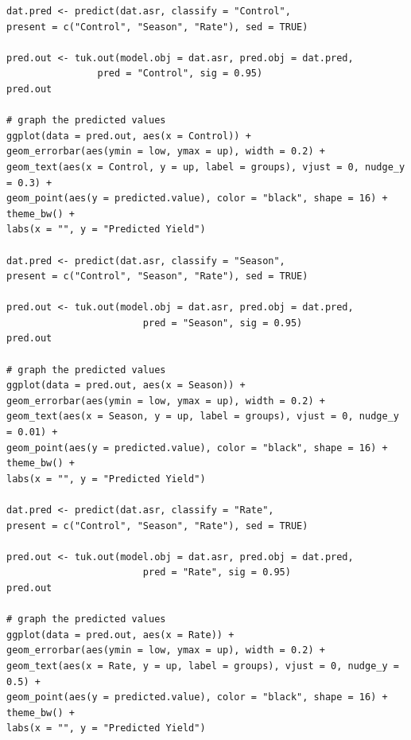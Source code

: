 \documentclass[a4paper, 10pt, fleqn, twosided]{memoir}
\begin{document}
\begin{tcolorbox}[title = Exercise 17 code]
\begin{verbatim}
dat.pred <- predict(dat.asr, classify = "Control",
present = c("Control", "Season", "Rate"), sed = TRUE)

pred.out <- tuk.out(model.obj = dat.asr, pred.obj = dat.pred,
                pred = "Control", sig = 0.95)
pred.out

# graph the predicted values 
ggplot(data = pred.out, aes(x = Control)) +
geom_errorbar(aes(ymin = low, ymax = up), width = 0.2) +
geom_text(aes(x = Control, y = up, label = groups), vjust = 0, nudge_y = 0.3) +
geom_point(aes(y = predicted.value), color = "black", shape = 16) + theme_bw() +
labs(x = "", y = "Predicted Yield")

dat.pred <- predict(dat.asr, classify = "Season",
present = c("Control", "Season", "Rate"), sed = TRUE)

pred.out <- tuk.out(model.obj = dat.asr, pred.obj = dat.pred,
                        pred = "Season", sig = 0.95)
pred.out
 
# graph the predicted values 
ggplot(data = pred.out, aes(x = Season)) +
geom_errorbar(aes(ymin = low, ymax = up), width = 0.2) +
geom_text(aes(x = Season, y = up, label = groups), vjust = 0, nudge_y = 0.01) +
geom_point(aes(y = predicted.value), color = "black", shape = 16) + theme_bw() +
labs(x = "", y = "Predicted Yield")

dat.pred <- predict(dat.asr, classify = "Rate",
present = c("Control", "Season", "Rate"), sed = TRUE)

pred.out <- tuk.out(model.obj = dat.asr, pred.obj = dat.pred,
                        pred = "Rate", sig = 0.95)
pred.out

# graph the predicted values 
ggplot(data = pred.out, aes(x = Rate)) +
geom_errorbar(aes(ymin = low, ymax = up), width = 0.2) +
geom_text(aes(x = Rate, y = up, label = groups), vjust = 0, nudge_y = 0.5) +
geom_point(aes(y = predicted.value), color = "black", shape = 16) + theme_bw() +
labs(x = "", y = "Predicted Yield")
\end{verbatim}
\end{tcolorbox}
\end{document}
